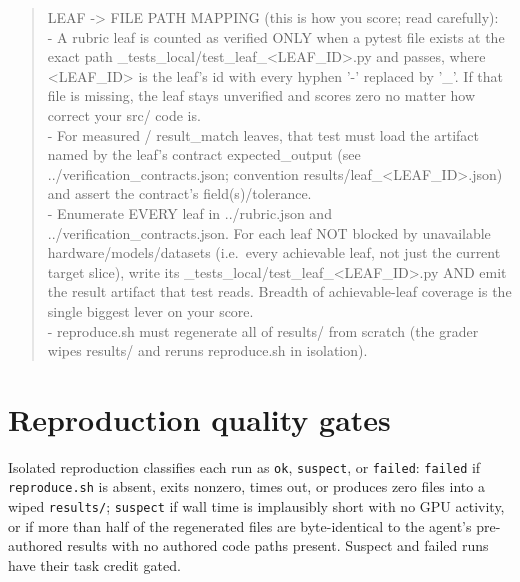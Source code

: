 \documentclass{article}
\begin{document}
\begin{quote}\small\ttfamily
LEAF -> FILE PATH MAPPING (this is how you score; read carefully):\\
- A rubric leaf is counted as verified ONLY when a pytest file exists at the
exact path \_tests\_local/test\_leaf\_<LEAF\_ID>.py and passes, where
<LEAF\_ID> is the leaf's id with every hyphen '-' replaced by '\_'. If that
file is missing, the leaf stays unverified and scores zero no matter how
correct your src/ code is.\\
- For measured / result\_match leaves, that test must load the artifact named
by the leaf's contract expected\_output (see ../verification\_contracts.json;
convention results/leaf\_<LEAF\_ID>.json) and assert the contract's
field(s)/tolerance.\\
- Enumerate EVERY leaf in ../rubric.json and ../verification\_contracts.json.
For each leaf NOT blocked by unavailable hardware/models/datasets (i.e.\ every
achievable leaf, not just the current target slice), write its
\_tests\_local/test\_leaf\_<LEAF\_ID>.py AND emit the result artifact that
test reads. Breadth of achievable-leaf coverage is the single biggest lever on
your score.\\
- reproduce.sh must regenerate all of results/ from scratch (the grader wipes
results/ and reruns reproduce.sh in isolation).
\end{quote}

\section{Reproduction quality gates}
\label{app:gates}

Isolated reproduction classifies each run as \texttt{ok}, \texttt{suspect}, or
\texttt{failed}: \texttt{failed} if \texttt{reproduce.sh} is absent, exits
nonzero, times out, or produces zero files into a wiped \texttt{results/};
\texttt{suspect} if wall time is implausibly short with no GPU activity, or if
more than half of the regenerated files are byte-identical to the agent's
pre-authored results with no authored code paths present. Suspect and failed
runs have their task credit gated.
\end{document}
